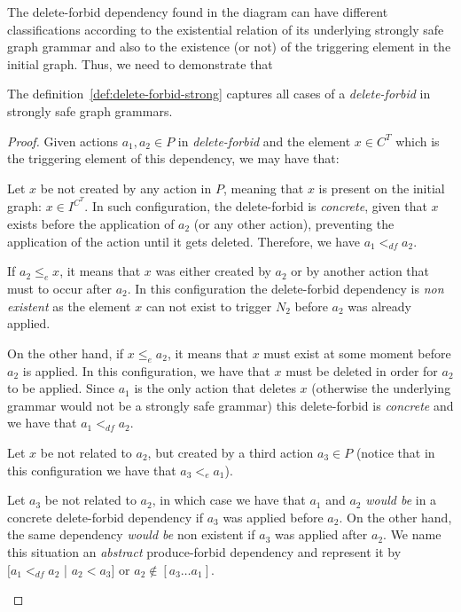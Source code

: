The delete-forbid dependency found in the diagram can have different classifications according to the existential relation of its underlying strongly safe graph grammar and also to the existence (or not) of the triggering element in the initial graph. Thus, we need to demonstrate that

\begin{thm} The definition~\ref{def:delete-forbid-strong} captures all cases of a \emph{delete-forbid} in strongly safe graph grammars.
\end{thm}

\begin{proof} Given actions $a_1,a_2 \in P$ in \emph{delete-forbid} and the element $x \in C^T$ which is the triggering element of this dependency, we may have that:
\hfill
\begin{description}[style=nextline,leftmargin=*]

  \item [Triggering element is present on the initial graph:]
Let $x$ be not created by any action in $P$, meaning that $x$ is present on the initial graph: $x \in I^{C^T}$. In such configuration, the delete-forbid is \emph{concrete}, given that $x$ exists before the application of $a_2$ (or any other action), preventing the application of the action until it gets deleted. Therefore, we have $a_1 <_{df} a_2$.

  \item [Triggering element is related to the action:] If $a_2 \leq_e x$, it means that $x$ was either created by $a_2$ or by another action that must to occur after $a_2$. In this configuration the delete-forbid dependency is \emph{non existent} as the element $x$ can not exist to trigger $N_2$ before $a_2$ was already applied.

    On the other hand, if $x \leq_e a_2$, it means that $x$ must exist at some moment before $a_2$ is applied. In this configuration, we have that $x$ must be deleted in order for $a_2$ to be applied. Since $a_1$ is the only action that deletes $x$ (otherwise the underlying grammar would not be a strongly safe grammar) this delete-forbid is \emph{concrete} and we have that $a_1 <_{df} a_2$.

\item [Triggering element is not related to the action:]
  Let $x$ be not related to $a_2$, but created by a third action $a_3 \in P$ (notice that in this configuration we have that $a_3 <_{e} a_1$).

    Let $a_3$ be not related to $a_2$, in which case we have that $a_1$ and $a_2$ \emph{would be} in a concrete delete-forbid dependency if $a_3$ was applied before $a_2$. On the other hand, the same dependency \emph{would be} non existent if $a_3$ was applied after $a_2$. We name this situation an \emph{abstract} produce-forbid dependency and represent it by $[a_1 <_{df} a_2$ | $a_2 < a_3]$ or $a_2 \not\in [a_3 \ldots a_1]$.


\end{description}
\end{proof}
